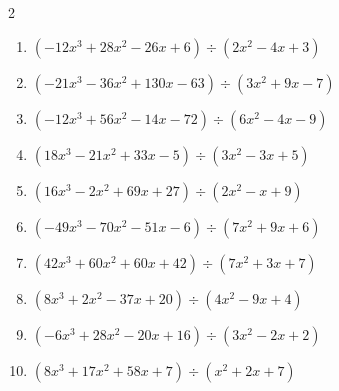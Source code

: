 \begin{multicols}{2}
\begin{enumerate}
        \phantom{$商 : -3x+4, \quad 剰余 : 6x+4$}

\columnbreak %

\resetques

  \item $(-12x^{3}+28x^{2}-26x+6) \div (2x^{2}-4x+3)$

        \phantom{$商 : -6x+2, \quad 剰余 : -5x+8$}

  \item $(-21x^{3}-36x^{2}+130x-63) \div (3x^{2}+9x-7)$

        \phantom{$商 : -7x+9, \quad 剰余 : 4x-3$}

  \item $(-12x^{3}+56x^{2}-14x-72) \div (6x^{2}-4x-9)$

        \phantom{$商 : -2x+8, \quad 剰余 : 5x+8$}

  \item $(18x^{3}-21x^{2}+33x-5) \div (3x^{2}-3x+5)$

        \phantom{$商 : 6x-1, \quad 剰余 : 8x+4$}

  \item $(16x^{3}-2x^{2}+69x+27) \div (2x^{2}-x+9)$

        \phantom{$商 : 8x+3, \quad 剰余 : -5x-1$}

\columnbreak %

  \item $(-49x^{3}-70x^{2}-51x-6) \div (7x^{2}+9x+6)$

        \phantom{$商 : -7x-1, \quad 剰余 : 3x+9$}

  \item $(42x^{3}+60x^{2}+60x+42) \div (7x^{2}+3x+7)$

        \phantom{$商 : 6x+6, \quad 剰余 : -6x-8$}

  \item $(8x^{3}+2x^{2}-37x+20) \div (4x^{2}-9x+4)$

        \phantom{$商 : 2x+5, \quad 剰余 : -5x-1$}

  \item $(-6x^{3}+28x^{2}-20x+16) \div (3x^{2}-2x+2)$

        \phantom{$商 : -2x+8, \quad 剰余 : x-3$}

  \item $(8x^{3}+17x^{2}+58x+7) \div (x^{2}+2x+7)$

        \phantom{$商 : 8x+1, \quad 剰余 : 9x+6$}

\columnbreak %

\resetques


\end{enumerate}
\end{multicols}

